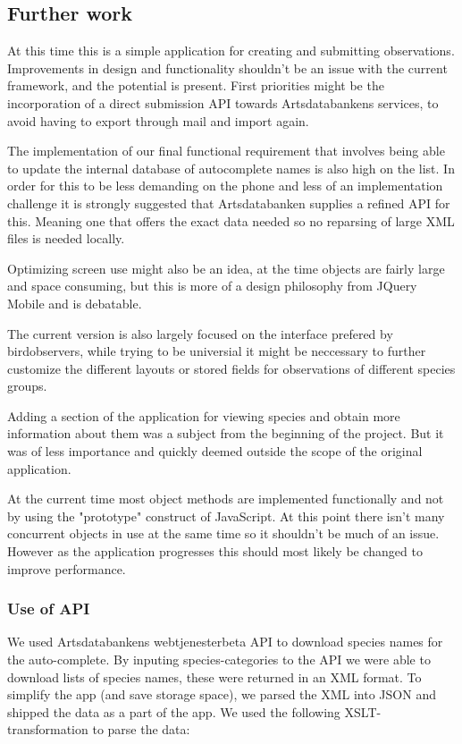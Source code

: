 \subsection{Further work}
At this time this is a simple application for creating and submitting
observations. Improvements in design and functionality shouldn't be an issue with the current framework,
and the potential is present. First priorities might be the incorporation of a
direct submission API towards Artsdatabankens services, to avoid having to
export through mail and import again. 

The implementation of our final functional requirement that involves being able to update
the internal database of autocomplete names is also high on the list. In order for this to be
less demanding on the phone and less of an implementation challenge it is strongly suggested 
that Artsdatabanken supplies a refined API for this.
Meaning one that offers the exact data needed so no reparsing of large XML files is needed locally.

Optimizing screen use might also be an
idea, at the time objects are fairly large and space consuming, but this is
more of a design philosophy from JQuery Mobile and is debatable.

The current version is also largely focused on the interface prefered by birdobservers, 
while trying to be universial it might be neccessary to further customize the different 
layouts or stored fields for observations of different species groups.

Adding a section of the application for viewing species and obtain more
information about them was a subject from the beginning of the project.  But it
was of less importance and quickly deemed outside the scope of the original
application.

At the current time most object methods are implemented functionally and not by
using the "prototype" construct of JavaScript.  At this point there isn't many
concurrent objects in use at the same time so it shouldn't be much of an issue.
However as the application progresses this should most likely be changed to
improve performance.

\subsubsection{Use of API}

We used Artsdatabankens webtjenesterbeta API to download species names for the
auto-complete. By inputing species-categories to the API we were able to
download lists of species names, these were returned in an XML format. To
simplify the app (and save storage space), we parsed the XML into JSON and
shipped the data as a part of the app. We used the following XSLT-transformation
to parse the data:


